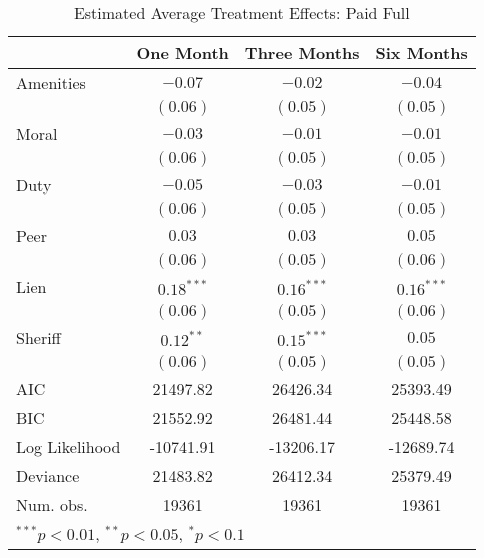 \documentclass[12pt,titlepage]{article}
\begin{document}
\begin{table}[htbp]
\caption{Estimated Average Treatment Effects: Paid Full}
\begin{center}
\begin{tabular}{l c c c }
\hline
               & One Month & Three Months & Six Months \\
\hline
Amenities      & $-0.07$      & $-0.02$      & $-0.04$      \\
               & $(0.06)$     & $(0.05)$     & $(0.05)$     \\
Moral          & $-0.03$      & $-0.01$      & $-0.01$      \\
               & $(0.06)$     & $(0.05)$     & $(0.05)$     \\
Duty           & $-0.05$      & $-0.03$      & $-0.01$      \\
               & $(0.06)$     & $(0.05)$     & $(0.05)$     \\
Peer           & $0.03$       & $0.03$       & $0.05$       \\
               & $(0.06)$     & $(0.05)$     & $(0.06)$     \\
Lien           & $0.18^{***}$ & $0.16^{***}$ & $0.16^{***}$ \\
               & $(0.06)$     & $(0.05)$     & $(0.06)$     \\
Sheriff        & $0.12^{**}$  & $0.15^{***}$ & $0.05$       \\
               & $(0.06)$     & $(0.05)$     & $(0.05)$     \\
\hline
AIC            & 21497.82     & 26426.34     & 25393.49     \\
BIC            & 21552.92     & 26481.44     & 25448.58     \\
Log Likelihood & -10741.91    & -13206.17    & -12689.74    \\
Deviance       & 21483.82     & 26412.34     & 25379.49     \\
Num. obs.      & 19361        & 19361        & 19361        \\
\hline
\multicolumn{4}{l}{\scriptsize{$^{***}p<0.01$, $^{**}p<0.05$, $^*p<0.1$}}
\end{tabular}
\label{tbl:reg7_pf}
\end{center}
\end{table}
\end{document}
